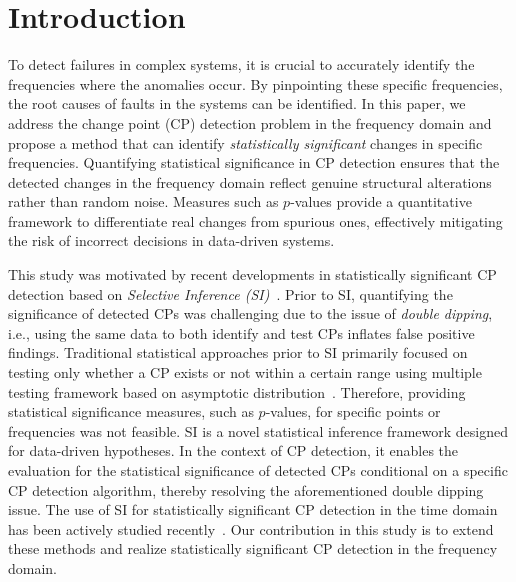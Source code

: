 \section{Introduction}
\label{sec:Introduction}
%
To detect failures in complex systems, it is crucial to accurately identify the frequencies where the anomalies occur.
%
By pinpointing these specific frequencies, the root causes of faults in the systems can be identified.
%
In this paper, we address the change point (CP) detection problem in the frequency domain and propose a method that can identify \emph{statistically significant} changes in specific frequencies.
%
Quantifying statistical significance in CP detection ensures that the detected changes in the frequency domain reflect genuine structural alterations rather than random noise.
%
Measures such as $p$-values provide a quantitative framework to differentiate real changes from spurious ones, effectively mitigating the risk of incorrect decisions in data-driven systems.

This study was motivated by recent developments in statistically significant CP detection based on \emph{Selective Inference (SI)}~\citep{taylor2015statistical, fithian2015selective, lee2014exact}.
%
Prior to SI, quantifying the significance of detected CPs was challenging due to the issue of \emph{double dipping}, i.e., using the same data to both identify and test CPs inflates false positive findings.
%
Traditional statistical approaches prior to SI primarily focused on testing only whether a CP exists or not within a certain range using multiple testing framework based on asymptotic distribution~\citep{page1954continuous, mika1999fisher}.
%
Therefore, providing statistical significance measures, such as $p$-values, for specific points or frequencies was not feasible.
%
SI is a novel statistical inference framework designed for data-driven hypotheses.
%
In the context of CP detection, it enables the evaluation for the statistical significance of detected CPs conditional on a specific CP detection algorithm, 
thereby resolving the aforementioned double dipping issue.
%
The use of SI for statistically significant CP detection in the time domain has been actively studied recently~\citep{hyun2018exact, duy2020computing}.
%
Our contribution in this study is to extend these methods and realize statistically significant CP detection in the frequency domain.
% 

